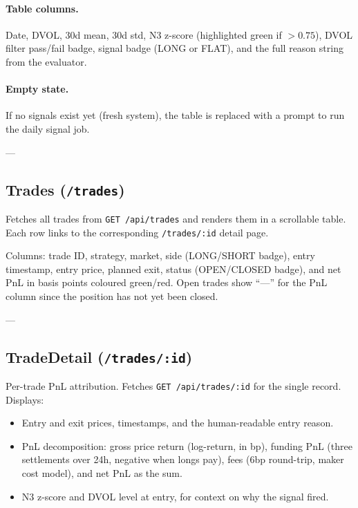 \documentclass[12pt, a4paper]{article}
\begin{document}
\paragraph{Table columns.}
Date, DVOL, 30d mean, 30d std, N3 z-score (highlighted green if $> 0.75$),
DVOL filter pass/fail badge, signal badge (LONG or FLAT), and the full
reason string from the evaluator.

\paragraph{Empty state.}
If no signals exist yet (fresh system), the table is replaced with a prompt
to run the daily signal job.

---

\subsection{Trades (\texttt{/trades})}

Fetches all trades from \texttt{GET /api/trades} and renders them in a
scrollable table. Each row links to the corresponding \texttt{/trades/:id}
detail page.

Columns: trade ID, strategy, market, side (LONG/SHORT badge), entry
timestamp, entry price, planned exit, status (OPEN/CLOSED badge), and
net PnL in basis points coloured green/red. Open trades show ``---'' for
the PnL column since the position has not yet been closed.

---

\subsection{TradeDetail (\texttt{/trades/:id})}

Per-trade PnL attribution. Fetches \texttt{GET /api/trades/:id} for the
single record. Displays:

\begin{itemize}[noitemsep]
  \item Entry and exit prices, timestamps, and the human-readable entry reason.
  \item PnL decomposition: gross price return (log-return, in bp), funding PnL
        (three settlements over 24h, negative when longs pay), fees (6bp
        round-trip, maker cost model), and net PnL as the sum.
  \item N3 z-score and DVOL level at entry, for context on why the signal fired.
\end{itemize}
\end{document}
